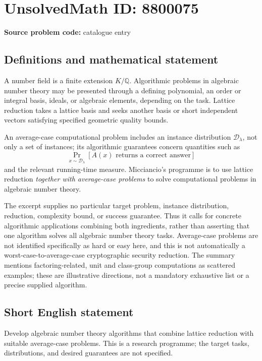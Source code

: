 \documentclass[11pt]{article}
\newcommand{\Q}{\mathbb{Q}}
\begin{document}
\section*{UnsolvedMath ID: 8800075}
\textbf{Source problem code:} catalogue entry
\subsection{Definitions and mathematical statement}
A number field is a finite extension \(K/\Q\). Algorithmic problems in algebraic number theory may be presented through a defining polynomial, an order or integral basis, ideals, or algebraic elements, depending on the task. Lattice reduction takes a lattice basis and seeks another basis or short independent vectors satisfying specified geometric quality bounds.

An average-case computational problem includes an instance distribution \(\mathcal D_\lambda\), not only a set of instances; its algorithmic guarantees concern quantities such as
\[
 \Pr_{x\sim\mathcal D_\lambda}[A(x)\text{ returns a correct answer}]
\]
and the relevant running-time measure. Micciancio's programme is to use lattice reduction \emph{together with average-case problems} to solve computational problems in algebraic number theory.

The excerpt supplies no particular target problem, instance distribution, reduction, complexity bound, or success guarantee. Thus it calls for concrete algorithmic applications combining both ingredients, rather than asserting that one algorithm solves all algebraic number theory tasks. Average-case problems are not identified specifically as hard or easy here, and this is not automatically a worst-case-to-average-case cryptographic security reduction. The summary mentions factoring-related, unit and class-group computations as scattered examples; these are illustrative directions, not a mandatory exhaustive list or a precise supplied algorithm.
\subsection{Short English statement}
Develop algebraic number theory algorithms that combine lattice reduction with suitable average-case problems. This is a research programme; the target tasks, distributions, and desired guarantees are not specified.
\end{document}
